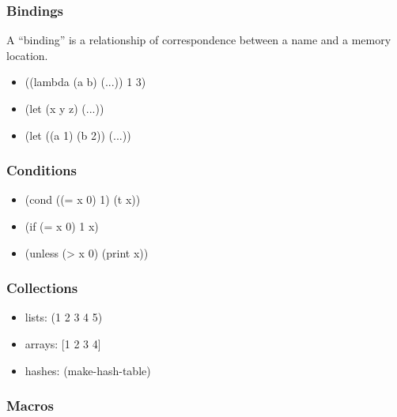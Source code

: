 \documentclass[16pt]{beamer}
\begin{document}
\begin{frame}
  \frametitle{Bindings}
  \begin{block}{}
  A ``binding'' is a relationship of
  correspondence between a name and a memory location.
  \end{block}
  \begin{itemize}
  \item ((lambda (a b) (...)) 1 3)
  \item (let (x y z) (...))
  \item (let ((a 1) (b 2)) (...))
  \end{itemize}
\end{frame}

\begin{frame}
  \frametitle{Conditions}
  \begin{itemize}
  \item (cond ((= x 0) 1) (t x))
  \item (if (= x 0) 1 x)
  \item (unless (> x 0) (print x))
  \end{itemize}
\end{frame}

\begin{frame}
  \frametitle{Collections}
  \begin{itemize}
  \item lists: (1 2 3 4 5)
  \item arrays: [1 2 3 4]
  \item hashes: (make-hash-table)
  \end{itemize}
\end{frame}

\begin{frame}
  \frametitle{Macros}
\end{frame}
\end{document}
